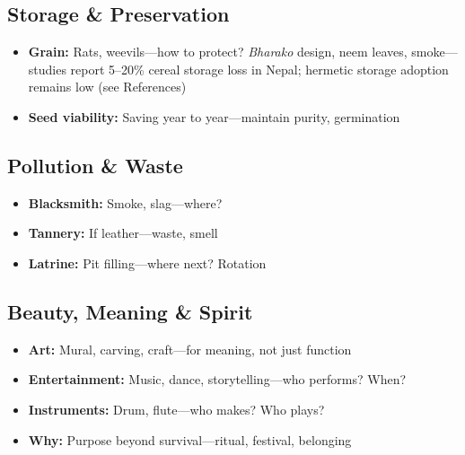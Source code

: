 \documentclass[11pt,a4paper]{article}
\begin{document}
\subsection{Storage \& Preservation}
\begin{itemize}
    \item \textbf{Grain:} Rats, weevils---how to protect? \textit{Bharako} design, neem leaves, smoke---studies report 5--20\% cereal storage loss in 
    Nepal; hermetic storage adoption remains low (see References)
    \item \textbf{Seed viability:} Saving year to year---maintain purity, germination
\end{itemize}

\subsection{Pollution \& Waste}
\begin{itemize}
    \item \textbf{Blacksmith:} Smoke, slag---where?
    \item \textbf{Tannery:} If leather---waste, smell
    \item \textbf{Latrine:} Pit filling---where next? Rotation
\end{itemize}

\subsection{Beauty, Meaning \& Spirit}
\begin{itemize}
    \item \textbf{Art:} Mural, carving, craft---for meaning, not just function
    \item \textbf{Entertainment:} Music, dance, storytelling---who performs? When?
    \item \textbf{Instruments:} Drum, flute---who makes? Who plays?
    \item \textbf{Why:} Purpose beyond survival---ritual, festival, belonging
\end{itemize}
\end{document}
